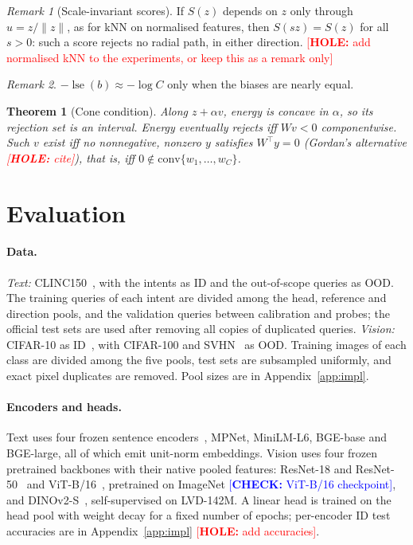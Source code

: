\documentclass[twoside]{article}
\newtheorem{theorem}{Theorem}
\theoremstyle{definition}
\theoremstyle{remark}
\newtheorem{remark}{Remark}
\newcommand{\hole}[1]{\textcolor{red}{[\textbf{HOLE:} #1]}}
\newcommand{\verify}[1]{\textcolor{blue}{[\textbf{CHECK:} #1]}}
\DeclareMathOperator{\lse}{lse}
\begin{document}
\begin{remark}[Scale-invariant scores]\label{rem:scaleinv}
If $S(z)$ depends on $z$ only through $u=z/\|z\|$, as for kNN on normalised features, then $S(sz)=S(z)$ for
all $s>0$: such a score rejects no radial path, in either direction. \hole{add normalised kNN to the
experiments, or keep this as a remark only}
\end{remark}

\begin{remark}
$-\lse(b)\approx-\log C$ only when the biases are nearly equal.
\end{remark}

\begin{theorem}[Cone condition]\label{thm:cone}
Along $z+\alpha v$, energy is concave in $\alpha$, so its rejection set is an interval. Energy eventually
rejects iff $Wv<0$ componentwise. Such $v$ exist iff no nonnegative, nonzero $y$ satisfies $W^\top y=0$
(Gordan's alternative \hole{cite}), that is, iff $0\notin\mathrm{conv}\{w_1,\dots,w_C\}$.
\end{theorem}

\section{Evaluation}\label{sec:eval}

\paragraph{Data.}
\emph{Text:} CLINC150~\citep{larson2019clinc}, with the intents as ID and the out-of-scope queries as OOD.
The training queries of each intent are divided among the head, reference and direction pools, and the
validation queries between calibration and probes; the official test sets are used after removing all
copies of duplicated queries. \emph{Vision:} CIFAR-10 as ID~\citep{krizhevsky2009cifar}, with CIFAR-100 and
SVHN~\citep{netzer2011svhn} as OOD. Training images of each class are divided among the five pools, test
sets are subsampled uniformly, and exact pixel duplicates are removed. Pool sizes are in
Appendix~\ref{app:impl}.

\paragraph{Encoders and heads.}
Text uses four frozen sentence encoders~\citep{reimers2019sbert,xiao2023bge}, MPNet, MiniLM-L6, BGE-base and
BGE-large, all of which emit unit-norm embeddings. Vision uses four frozen pretrained backbones with their
native pooled features: ResNet-18 and ResNet-50~\citep{he2016resnet} and ViT-B/16~\citep{dosovitskiy2021vit},
pretrained on ImageNet \verify{ViT-B/16 checkpoint}, and DINOv2-S~\citep{oquab2023dinov2}, self-supervised on
LVD-142M. A linear head is trained on the head pool with weight decay for a fixed number of epochs; per-encoder
ID test accuracies are in Appendix~\ref{app:impl} \hole{add accuracies}.
\end{document}
